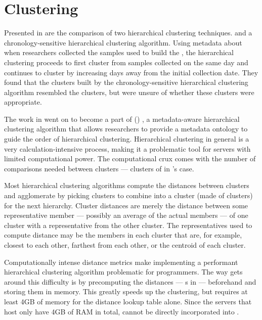 \section{Clustering}
Presented in \cite{DBLP:conf/bibm/MontanaDNBK11, montana2012investigating} are the comparison of two hierarchical clustering techniques. \primerfive{} \cite{clarke1993non} and a chronology-sensitive hierarchical clustering algorithm.
Using metadata about when researchers collected the samples used to build the \isols{}, the hierarchical clustering proceeds to first cluster \isols{} from samples collected on the same day and continues to cluster by increasing days away from the initial collection date.
They found that the clusters built by the chronology-sensitive hierarchical clustering algorithm resembled the \primerfive{} clusters, but were unsure of whether these clusters were appropriate.

The work in \cite{DBLP:conf/bibm/MontanaDNBK11, montana2012investigating} went on to become a part of \ohclust{} (\ohclustlong{}) \cite{SolimanDVMBNWKG12, montana2013ontological, montana2013algorithms}, a metadata-aware hierarchical clustering algorithm that allows \cplop{} researchers to provide a metadata ontology to guide the order of hierarchical clustering.
Hierarchical clustering in general is a very calculation-intensive process, making it a problematic tool for servers with limited computational power.
The computational crux comes with the number of comparisons needed between clusters --- clusters of \isols{} in \cplop{}'s case.

Most hierarchical clustering algorithms compute the distances between clusters and agglomerate by picking clusters to combine into a cluster (made of clusters) for the next hierarchy.
Cluster distances are merely the distance between some representative member --- possibly an average of the actual members --- of one cluster with a representative from the other cluster.
The representatives used to compute distance may be the members in each cluster that are, for example, closest to each other, farthest from each other, or the centroid of each cluster.

Computationally intense distance metrics make implementing a performant hierarchical clustering algorithm problematic for programmers.
The way \ohclust{} gets around this difficulty is by precomputing the distances --- \pearson{}s in \cplop{} --- beforehand and storing them in memory.
This greatly speeds up the clustering, but requires at least 4GB of memory for the distance lookup table alone.
Since the servers that host \cplop{} only have 4GB of RAM in total, \ohclust{} cannot be directly incorporated into \cplop{}.

